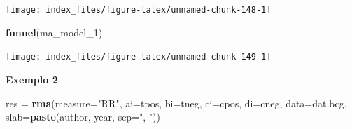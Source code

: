\documentclass[12pt,brazil,oneside]{book}
\newenvironment{Shaded}{\begin{snugshade}}{\end{snugshade}}
\newcommand{\DataTypeTok}[1]{\textcolor[rgb]{0.13,0.29,0.53}{#1}}
\newcommand{\DecValTok}[1]{\textcolor[rgb]{0.00,0.00,0.81}{#1}}
\newcommand{\KeywordTok}[1]{\textcolor[rgb]{0.13,0.29,0.53}{\textbf{#1}}}
\newcommand{\NormalTok}[1]{#1}
\newcommand{\StringTok}[1]{\textcolor[rgb]{0.31,0.60,0.02}{#1}}
\begin{document}
\begin{center}\texttt{[image: index\_files/figure-latex/unnamed-chunk-148-1]} \end{center}

\begin{Shaded}
\begin{Highlighting}[]
\KeywordTok{funnel}\NormalTok{(ma_model_}\DecValTok{1}\NormalTok{)}
\end{Highlighting}
\end{Shaded}

\begin{center}\texttt{[image: index\_files/figure-latex/unnamed-chunk-149-1]} \end{center}

\textbf{Exemplo 2}

\begin{Shaded}
\begin{Highlighting}[]
\NormalTok{res =}\StringTok{ }\KeywordTok{rma}\NormalTok{(}\DataTypeTok{measure=}\StringTok{"RR"}\NormalTok{, }\DataTypeTok{ai=}\NormalTok{tpos, }\DataTypeTok{bi=}\NormalTok{tneg, }\DataTypeTok{ci=}\NormalTok{cpos, }\DataTypeTok{di=}\NormalTok{cneg, }\DataTypeTok{data=}\NormalTok{dat.bcg,}
           \DataTypeTok{slab=}\KeywordTok{paste}\NormalTok{(author, year, }\DataTypeTok{sep=}\StringTok{", "}\NormalTok{))}
\end{Highlighting}
\end{Shaded}
\end{document}
